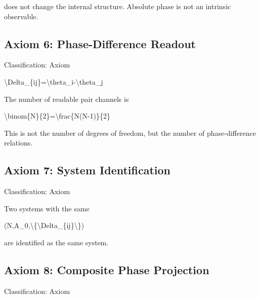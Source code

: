\documentclass[
  a4paper,
]{article}
\newenvironment{Shaded}{}{}
\newcommand{\NormalTok}[1]{#1}
\begin{document}
does not change the internal structure. Absolute phase is not an
intrinsic observable.

\subsection{Axiom 6: Phase-Difference
Readout}\label{axiom-6-phase-difference-readout}

Classification: Axiom

\begin{Shaded}
\begin{Highlighting}[]
\NormalTok{\textbackslash{}Delta\_\{ij\}=\textbackslash{}theta\_i{-}\textbackslash{}theta\_j}
\end{Highlighting}
\end{Shaded}

The number of readable pair channels is

\begin{Shaded}
\begin{Highlighting}[]
\NormalTok{\textbackslash{}binom\{N\}\{2\}=\textbackslash{}frac\{N(N{-}1)\}\{2\}}
\end{Highlighting}
\end{Shaded}

This is not the number of degrees of freedom, but the number of
phase-difference relations.

\subsection{Axiom 7: System
Identification}\label{axiom-7-system-identification}

Classification: Axiom

Two systems with the same

\begin{Shaded}
\begin{Highlighting}[]
\NormalTok{(N,A\_0,\textbackslash{}\{\textbackslash{}Delta\_\{ij\}\textbackslash{}\})}
\end{Highlighting}
\end{Shaded}

are identified as the same system.

\subsection{Axiom 8: Composite Phase
Projection}\label{axiom-8-composite-phase-projection}

Classification: Axiom
\end{document}

